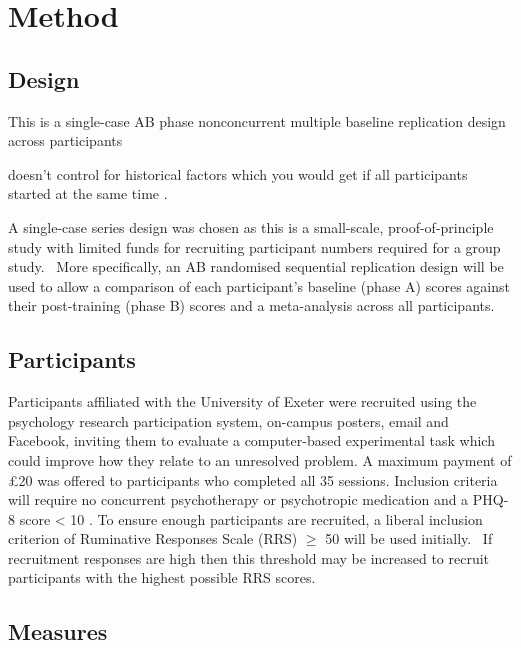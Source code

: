 \documentclass[man,floatsintext,a4paper,biblatex]{apa6}
\begin{document}
\section{Method}

\subsection{Design}

This is a single-case AB phase nonconcurrent multiple baseline
replication design across participants \parencite{bulte_when_2012}
\parencite{onghena_customization_2005}

doesn't control for historical factors which you
would get if all participants started at the same time
\parencite{watson_non-concurrent_1981}.


A single-case series design was chosen as this is a small-scale,
proof-of-principle study with limited funds for recruiting participant
numbers required for a group study. \ More specifically, an AB randomised
sequential replication design \parencite{onghena_customization_2005} will
be used to allow a comparison of each participant's baseline (phase A)
scores against their post-training (phase B) scores and a meta-analysis
across all participants.

\subsection{Participants}

Participants affiliated with the University of Exeter were recruited using
the psychology research participation system, on-campus posters, email
and Facebook,  inviting them to evaluate a computer-based experimental
task which could improve how they relate to an unresolved problem.
A maximum payment of {\pounds}20 was offered to participants who
completed all 35 sessions.  Inclusion criteria will require no concurrent
psychotherapy or psychotropic medication and a PHQ-8 score {\textless}
10 \parencite{kroenke_phq-8_2009}.  To ensure enough participants are
recruited, a liberal inclusion criterion of Ruminative Responses Scale
(RRS) ${\geq}$ 50 \parencite{treynor_rumination_2003} will be used
initially. \ If recruitment responses are high then this threshold may
be increased to recruit participants with the highest possible RRS scores.

\subsection{Measures}
\end{document}
